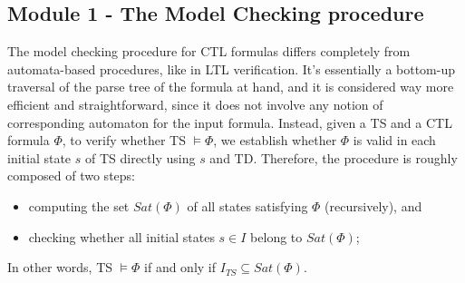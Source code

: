 \documentclass{article}
\begin{document}
\subsection*{Module 1 - The Model Checking procedure}
\label{subsec:mc}
The model checking procedure for CTL formulas differs completely from automata-based procedures, like in LTL verification. It's essentially a bottom-up traversal of the parse tree of the formula at hand, and it is considered way more efficient and straightforward, since it does not involve any notion of corresponding automaton for the input formula. Instead, given a TS and a CTL formula $\Phi$, to verify whether TS $\vDash \Phi$, we establish whether $\Phi$ is valid in each initial state $s$ of TS directly using $s$ and TD. 
Therefore, the procedure is roughly composed of two steps: 
\begin{itemize}
    \item computing the set $Sat(\Phi)$ of all states satisfying $\Phi$ (recursively), and
    \item checking whether all initial states $s \in I$ belong to $Sat(\Phi)$; 
\end{itemize}
In other words, TS $\vDash \Phi$ if and only if $I_{TS} \subseteq Sat(\Phi)$.
\end{document}
